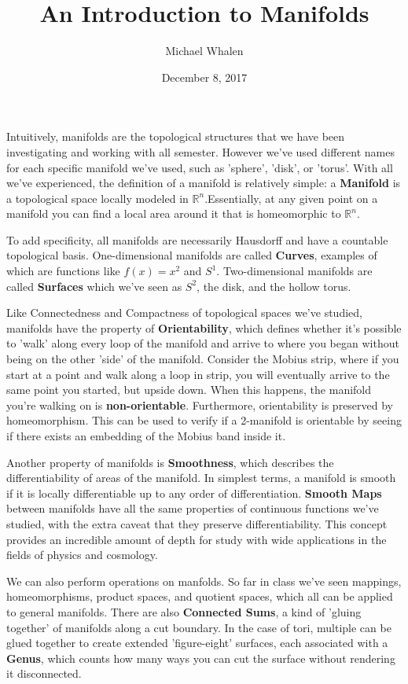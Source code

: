 \documentclass[letterpaper,12pt]{article}
\begin{document}
\title{An Introduction to Manifolds}
\author{Michael Whalen}
\date{December 8, 2017}
\maketitle


Intuitively, manifolds are the topological structures that we have been investigating and working with all semester. However we've used different names for each specific manifold we've used, such as 'sphere', 'disk', or 'torus'. With all we've experienced, the definition of a manifold is relatively simple: a \textbf{Manifold} is a topological space locally modeled in $\mathbb{R}^{n}$.\cite[p.109]{Thurston}Essentially, at any given point on a manifold you can find a local area around it that is homeomorphic to $\mathbb{R}^{n}$. 

To add specificity, all manifolds are necessarily Hausdorff and have a countable topological basis. One-dimensional manifolds are called \textbf{Curves}, examples of which are functions like $f(x) = x^{2}$ and $S^{1}$. Two-dimensional manifolds are called \textbf{Surfaces} which we've seen as $S^{2}$, the disk, and the hollow torus. 

Like Connectedness and Compactness of topological spaces we've studied, manifolds have the property of \textbf{Orientability}, which defines whether it's possible to 'walk' along every loop of the manifold and arrive to where you began without being on the other 'side' of the manifold. Consider the Mobius strip, where if you start at a point and walk along a loop in strip, you will eventually arrive to the same point you started, but upside down. When this happens, the manifold you're walking on is \textbf{non-orientable}. Furthermore, orientability is preserved by homeomorphism. This can be used to verify if a 2-manifold is orientable by seeing if there exists an embedding of the Mobius band inside it. 

Another property of manifolds is \textbf{Smoothness}, which describes the differentiability of areas of the manifold. In simplest terms, a manifold is smooth if it is locally differentiable up to any order of differentiation. \textbf{Smooth Maps} between manifolds have all the same properties of continuous functions we've studied, with the extra caveat that they preserve differentiability. \cite[p.61]{Tu} This concept provides an incredible amount of depth for study with wide applications in the fields of physics and cosmology.

We can also perform operations on manfolds. So far in class we've seen mappings, homeomorphisms, product spaces, and quotient spaces, which all can be applied to general manifolds. There are also \textbf{Connected Sums}, a kind of 'gluing together' of manifolds along a cut boundary. In the case of tori, multiple can be glued together to create extended 'figure-eight' surfaces, each associated with a \textbf{Genus}, which counts how many ways you can cut the surface without rendering it disconnected.
\end{document}
